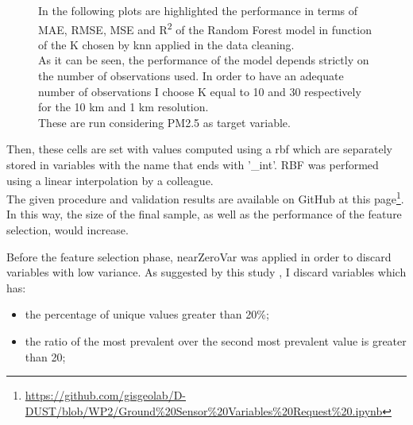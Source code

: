 \begin{figure}[H] 
    \centering
    \hfill%
    \caption{In the following plots are highlighted the performance in terms of MAE, RMSE, MSE and R\textsuperscript{2} of the Random Forest model in function of the K chosen by \acrshort{knn} applied in the data cleaning.\\
    As it can be seen, the performance of the model depends strictly on the number of observations used. In order to have an adequate number of observations I choose K equal to 10 and 30 respectively for the 10 km and 1 km resolution. \\
    These are run considering PM2.5 as target variable.}
    \label{fig:knn_chosen}
\end{figure}
Then, these cells are set with values computed using a \gls{rbf}  \cite{wright2003radial} which are separately stored in variables with the name that ends with '\_int'. RBF was performed using a linear interpolation by a colleague.\\
The given procedure and validation results are available on GitHub at this page\footnote{\url{https://github.com/gisgeolab/D-DUST/blob/WP2/Ground\%20Sensor\%20Variables\%20Request\%20.ipynb}}.
In this way, the size of the final sample, as well as the performance of the feature selection, would increase.
\par
Before the feature selection phase, nearZeroVar was applied in order to discard variables with low variance.
As suggested by this study \cite{kuhn2008building} , I discard variables which has: 
\begin{itemize}
    \item the percentage of unique values greater than 20\%;
    \item the ratio of the most prevalent over the second most prevalent value is greater than 20;
\end{itemize} 


